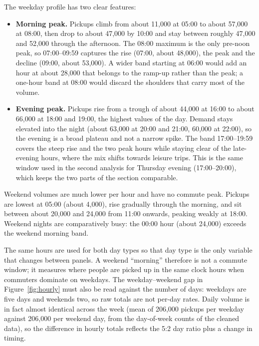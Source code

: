 \documentclass[11pt,a4paper]{article}
\begin{document}
The weekday profile has two clear features:
\begin{itemize}
    \item \textbf{Morning peak.} Pickups climb from about 11,000 at 05:00 to about 57,000 at 08:00, then drop to about 47,000 by 10:00 and stay between roughly 47,000 and 52,000 through the afternoon. The 08:00 maximum is the only pre-noon peak, so 07:00--09:59 captures the rise (07:00, about 48,000), the peak and the decline (09:00, about 53,000). A wider band starting at 06:00 would add an hour at about 28,000 that belongs to the ramp-up rather than the peak; a one-hour band at 08:00 would discard the shoulders that carry most of the volume.
    \item \textbf{Evening peak.} Pickups rise from a trough of about 44,000 at 16:00 to about 66,000 at 18:00 and 19:00, the highest values of the day. Demand stays elevated into the night (about 63,000 at 20:00 and 21:00, 60,000 at 22:00), so the evening is a broad plateau and not a narrow spike. The band 17:00--19:59 covers the steep rise and the two peak hours while staying clear of the late-evening hours, where the mix shifts towards leisure trips. This is the same window used in the second analysis for Thursday evening (17:00--20:00), which keeps the two parts of the section comparable.
\end{itemize}

Weekend volumes are much lower per hour and have no commute peak. Pickups are lowest at 05:00 (about 4,000), rise gradually through the morning, and sit between about 20,000 and 24,000 from 11:00 onwards, peaking weakly at 18:00. Weekend nights are comparatively busy: the 00:00 hour (about 24,000) exceeds the weekend morning band.

The same hours are used for both day types so that day type is the only variable that changes between panels. A weekend ``morning'' therefore is not a commute window; it measures where people are picked up in the same clock hours when commuters dominate on weekdays. The weekday--weekend gap in Figure~\ref{fig:hourly} must also be read against the number of days: weekdays are five days and weekends two, so raw totals are not per-day rates. Daily volume is in fact almost identical across the week (mean of 206,000 pickups per weekday against 206,000 per weekend day, from the day-of-week counts of the cleaned data), so the difference in hourly totals reflects the 5:2 day ratio plus a change in timing.
\end{document}
